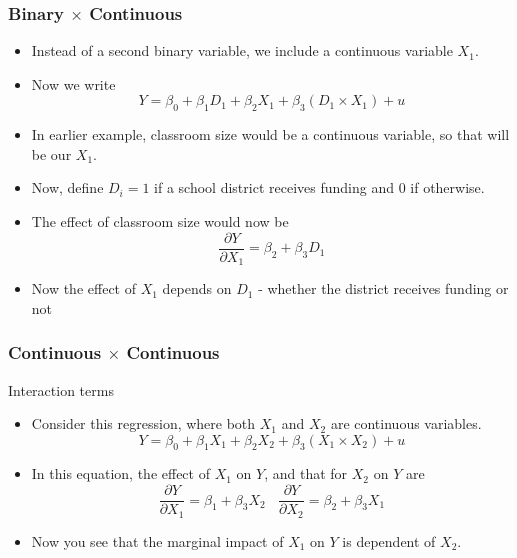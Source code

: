 \documentclass[aspectratio=169]{beamer}
\begin{document}
\begin{frame}
\frametitle{Binary $\times$ Continuous}
\begin{itemize}
\item  Instead of a second binary variable, we include a continuous variable $X_1$. 
\item Now we write
\[
Y= \beta_0 + \beta_1 D_1 + \beta_2 X_1 + \beta_3 (D_1 \times X_1) + u
\]
\item In earlier example, classroom size would be a continuous variable, so that will be our $X_1$. 
\item Now, define $D_i=1$ if a school district receives funding and $0$ if otherwise. 
\item The effect of classroom size would now be 
\[
\frac{\partial Y}{\partial X_1} = \beta_2 + \beta_3 D_1
\]
\item Now the effect of $X_1$ depends on $D_1$ - whether the district receives funding or not
\end{itemize}
\end{frame}

\begin{frame}
\frametitle{Continuous $\times$ Continuous}
Interaction terms
\begin{itemize}
\item  Consider this regression, where both $X_1$ and $X_2$ are continuous variables. 
\[
Y = \beta_0 + \beta_1X_1 + \beta_2 X_2 + \beta_3 (X_1\times X_2)+u
\] 
\item In this equation, the effect of $X_1$ on $Y$, and that for $X_2$ on $Y$ are
\[
\frac{\partial Y}{\partial X_1} = \beta_1 + \beta_3 X_2 \ \ \ \ \frac{\partial Y}{\partial X_2} = \beta_2 + \beta_3 X_1 
\]
\item Now you see that the marginal impact of $X_1$ on $Y$ is dependent of $X_2$. 
\end{itemize}
\end{frame}


\end{document}
